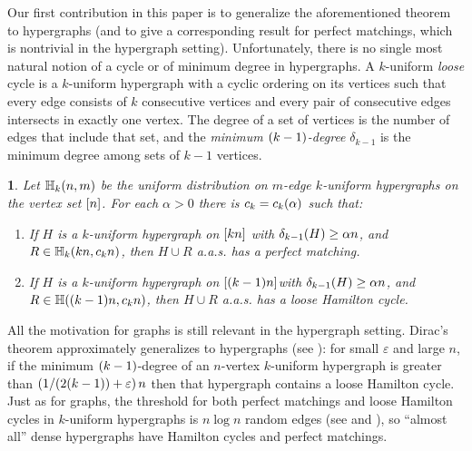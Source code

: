 \documentclass[11pt,english]{article}
\theoremstyle{plain}
\newtheorem{thm}{\protect\theoremname}
\theoremstyle{definition}
\theoremstyle{definition}
\theoremstyle{plain}
\theoremstyle{plain}
\theoremstyle{plain}
\theoremstyle{plain}
\theoremstyle{remark}
\theoremstyle{remark}
\let\originalleft\left
\let\originalright\right
\renewcommand{\left}{\mathopen{}\mathclose\bgroup\originalleft}
\renewcommand{\right}{\aftergroup\egroup\originalright}
\providecommand{\theoremname}{Theorem}
\begin{document}
Our first contribution in this paper is to generalize the aforementioned
theorem to hypergraphs (and to give a corresponding result for perfect
matchings, which is nontrivial in the hypergraph setting). Unfortunately,
there is no single most natural notion of a cycle or of minimum degree
in hypergraphs. A $k$-uniform \emph{loose} cycle is a $k$-uniform
hypergraph with a cyclic ordering on its vertices such that every
edge consists of $k$ consecutive vertices and every pair of consecutive
edges intersects in exactly one vertex. The degree of a set of vertices
is the number of edges that include that set, and the \emph{minimum
$\left(k-1\right)$-degree }$\delta_{k-1}$ is the minimum degree
among sets of $k-1$ vertices.
\begin{thm}
\label{thm:hypergraph-theorems}Let $\HH_{k}\left(n,m\right)$ be
the uniform distribution on $m$-edge $k$-uniform hypergraphs on
the vertex set $\range n$. For each $\alpha>0$ there is $\chyp=\chyp\left(\alpha\right)$ such that:

\begin{enumerate}[topsep=0px,label=(\alph*)]

\item{\label{itm:hypergraph-matching-theorem}If $H$ is
a $k$-uniform hypergraph on $\left[kn\right]$ with $\delta_{k-1}\left(H\right)\ge\alpha n$,
and $R\in\HH_{k}\left(kn,\chypmat n\right)$, then
$H\cup R$ a.a.s. has a perfect matching.}

\item{\label{itm:hypergraph-cycle-theorem}If $H$ is
a $k$-uniform hypergraph on $\left[\left(k-1\right)n\right]$with
$\delta_{k-1}\left(H\right)\ge\alpha n$, and $R\in\HH\left(\left(k-1\right)n,\chypham n\right)$,
then $H\cup R$ a.a.s. has a loose Hamilton cycle.}

\end{enumerate}
\end{thm}
All the motivation for graphs is still relevant in the hypergraph setting. Dirac's theorem approximately generalizes to hypergraphs (see \cite{KKMO11}): for small $\varepsilon$ and large $n$, if the minimum $\left(k-1\right)$-degree of an $n$-vertex $k$-uniform hypergraph is greater than $\left(1/\left(2\left(k-1\right)\right)+\varepsilon\right)\,n$ then that hypergraph contains a loose Hamilton cycle. Just as for graphs, the threshold for both perfect matchings and loose Hamilton cycles in $k$-uniform hypergraphs is $n\log n$ random
edges (see \cite{DF11} and \cite[Corollary~2.6]{JKV08}), so ``almost
all'' dense hypergraphs have Hamilton cycles and perfect matchings.
\end{document}
